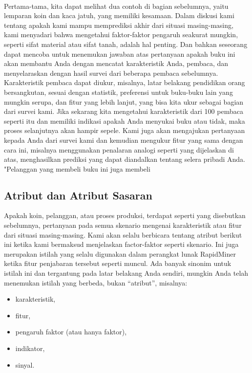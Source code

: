 \paragraph{}Pertama-tama, kita dapat melihat dua contoh di bagian sebelumnya, yaitu lemparan koin dan kaca jatuh, yang memiliki kesamaan. Dalam diskusi kami tentang apakah kami mampu memprediksi akhir dari situasi masing-masing, kami menyadari bahwa mengetahui faktor-faktor pengaruh seakurat mungkin, seperti sifat material atau sifat tanah, adalah hal penting. Dan bahkan seseorang dapat mencoba untuk menemukan jawaban atas pertanyaan apakah buku ini akan membantu Anda dengan mencatat karakteristik Anda, pembaca, dan menyelaraskan dengan hasil survei dari beberapa pembaca sebelumnya. Karakteristik pembaca dapat diukur, misalnya, latar belakang pendidikan orang bersangkutan, sesuai dengan statistik, preferensi untuk buku-buku lain yang mungkin serupa, dan fitur yang lebih lanjut, yang bisa kita ukur sebagai bagian dari survei kami. Jika sekarang kita mengetahui karakteristik dari 100 pembaca seperti itu dan memiliki indikasi apakah Anda menyukai buku atau tidak, maka proses selanjutnya akan hampir sepele. Kami juga akan mengajukan pertanyaan kepada Anda dari survei kami dan kemudian mengukur fitur yang sama dengan cara ini, misalnya menggunakan penalaran analogi seperti yang dijelaskan di atas, menghasilkan prediksi yang dapat diandalkan tentang selera pribadi Anda. "Pelanggan yang membeli buku ini juga membeli 

\subsection{Atribut dan Atribut Sasaran }
\par Apakah koin, pelanggan, atau proses produksi, terdapat seperti yang disebutkan sebelumnya, pertanyaan pada semua skenario mengenai karakteristik atau fitur dari situasi masing-masing. Kami akan selalu berbicara tentang atribut berikut ini ketika kami bermaksud menjelaskan factor-faktor seperti skenario. Ini juga merupakan istilah yang selalu digunakan dalam perangkat lunak RapidMiner ketika fitur penjabaran tersebut seperti muncul. Ada banyak sinonim untuk istilah ini dan tergantung pada latar belakang Anda sendiri, mungkin Anda telah menemukan istilah yang berbeda, bukan “atribut”, misalnya:

\begin{itemize}
    \item karakteristik,
 \item	fitur, 
 \item	pengaruh faktor (atau hanya faktor), 
 \item	indikator, 
 \item	sinyal.

\end{itemize}

